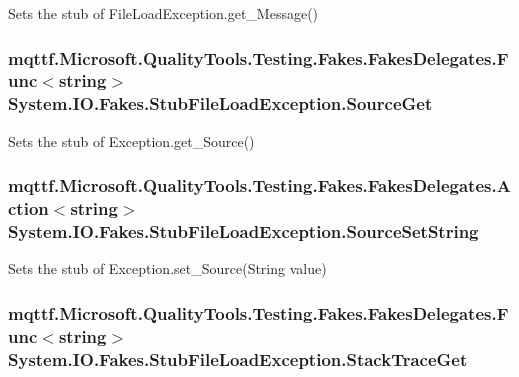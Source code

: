 Sets the stub of File\-Load\-Exception.\-get\-\_\-\-Message()

\hypertarget{class_system_1_1_i_o_1_1_fakes_1_1_stub_file_load_exception_acb01de7cf171165ee749296d5a7ab702}{
\subsubsection[{Source\-Get}]{\setlength{\rightskip}{0pt plus 5cm}mqttf.\-Microsoft.\-Quality\-Tools.\-Testing.\-Fakes.\-Fakes\-Delegates.\-Func$<$string$>$ System.\-I\-O.\-Fakes.\-Stub\-File\-Load\-Exception.\-Source\-Get}}\label{class_system_1_1_i_o_1_1_fakes_1_1_stub_file_load_exception_acb01de7cf171165ee749296d5a7ab702}


Sets the stub of Exception.\-get\-\_\-\-Source()

\hypertarget{class_system_1_1_i_o_1_1_fakes_1_1_stub_file_load_exception_ad6967ec9c6ad8ce17e86c27a261db475}{
\subsubsection[{Source\-Set\-String}]{\setlength{\rightskip}{0pt plus 5cm}mqttf.\-Microsoft.\-Quality\-Tools.\-Testing.\-Fakes.\-Fakes\-Delegates.\-Action$<$string$>$ System.\-I\-O.\-Fakes.\-Stub\-File\-Load\-Exception.\-Source\-Set\-String}}\label{class_system_1_1_i_o_1_1_fakes_1_1_stub_file_load_exception_ad6967ec9c6ad8ce17e86c27a261db475}


Sets the stub of Exception.\-set\-\_\-\-Source(\-String value)

\hypertarget{class_system_1_1_i_o_1_1_fakes_1_1_stub_file_load_exception_a04d565310670b6beefe3f981f8cf2f29}{
\subsubsection[{Stack\-Trace\-Get}]{\setlength{\rightskip}{0pt plus 5cm}mqttf.\-Microsoft.\-Quality\-Tools.\-Testing.\-Fakes.\-Fakes\-Delegates.\-Func$<$string$>$ System.\-I\-O.\-Fakes.\-Stub\-File\-Load\-Exception.\-Stack\-Trace\-Get}}\label{class_system_1_1_i_o_1_1_fakes_1_1_stub_file_load_exception_a04d565310670b6beefe3f981f8cf2f29}



